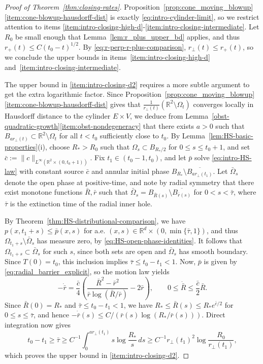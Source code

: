 \documentclass[11pt]{amsart}
\numberwithin{equation}{section}
\numberwithin{figure}{section}
\theoremstyle{plain}
\theoremstyle{definition}
\theoremstyle{remark}
\theoremstyle{plain}
\newcommand{\norm}[1]{\lVert #1 \rVert}
\def\R{\mathbb{R}}
\begin{document}
\begin{proof}[Proof of Theorem~\ref{thm:closing-rates}]

Proposition~\ref{prop:cone_moving_blowup}\ref{item:cone-blowup-hausdorff-dist} is exactly
\eqref{eq:intro-cylinder-limit}, so we restrict attention to items \ref{item:intro-closing-high-d}-\ref{item:intro-closing-intermediate}. Let $R_0$ be small enough that Lemma~\ref{lem:r_plus_upper_bd} applies, and thus $r_+(t)\leq C(t_0-t)^{1/2}$. By \eqref{eq:r-perp-r-plus-comparison}, $r_\perp(t)\leq r_+(t)$, so we conclude the upper bounds in items~\ref{item:intro-closing-high-d}
and~\ref{item:intro-closing-intermediate}.

The upper bound in \ref{item:intro-closing-d2} requires a more subtle argument to get the extra logarithmic factor. Since Proposition~\ref{prop:cone_moving_blowup}\ref{item:cone-blowup-hausdorff-dist} gives that $\frac{1}{r_\perp(t)}(\R^2\setminus \Omega_t)$ converges locally in Hausdorff distance to the cylinder $E \times V$, we deduce from Lemma~\ref{obst-quadratic-growth}\ref{item:obst-nondegeneracy} that there exists $a > 0$ such that $B_{a r_\perp(t)} \subset \R^2\setminus \Omega_t$ for all $t < t_0$ sufficiently close to $t_0$. By Lemma~\ref{lem:HS-basic-properties}(i), choose $R_*>R_0$
such that $\Omega_s\subset B_{R_*/2}$ for $0\leq s\leq t_0+1$, and set
$\bar c:=\norm{c}_{L^\infty(\R^2\times(0,t_0+1))}$. Fix $t_1\in (t_0-1, t_0)$, and let $\bar{p}$ solve \eqref{eq:intro-HS-law} with constant source $\bar c$ and annular initial phase $B_{R_*}\setminus \overline{B_{ar_\perp(t_1)}}$. Let $\bar \Omega_s$ denote the open phase at positive-time, and note by radial symmetry that there exist monotone functions $\bar R, \bar r$ such that $\bar \Omega_s = B_{\bar R(s)}\setminus \overline{B_{\bar r(s)}}$ for $0 < s < \bar \tau$, where $\bar \tau$ is the extinction time of the radial inner hole.

By Theorem~\ref{thm:HS-distributional-comparison}, we have $p(x,t_1 +s) \leq \bar p(x, s)$ for a.e. $(x,s)\in \R^d\times (0,\min\{\bar\tau,1\})$, and thus $ \Omega_{t_1+s} \setminus \bar \Omega_{s} $ has measure zero, by \eqref{eq:HS-open-phase-identities}. It follows that $\Omega_{t_1 + s}\subset \bar \Omega_s$ for such $s$, since both sets are open and $\bar \Omega_s$ has smooth boundary. Since $T(0)=t_0$, this inclusion implies $\bar\tau\leq t_0-t_1<1$. Now, $\bar p$ is given by \eqref{eq:radial_barrier_explicit}, so the motion law yields
\[
    -\dot{\bar r}
    =\frac{\bar c}{4}\left(
        \frac{\bar R^2-\bar r^2}{\bar r\log(\bar R/\bar r)}
        -2\bar r\right),
    \qquad
    0\leq\dot{\bar R}\leq\frac{\bar c}{2}\bar R.
\]
Since $\bar R(0)=R_*$ and $\bar\tau\leq t_0-t_1<1$, we have
$R_*\leq\bar R(s)\leq R_*e^{\bar c/2}$ for $0\leq s\leq\bar\tau$, and hence
$-\dot{\bar r}(s)\leq C/(\bar r(s)\log(R_*/\bar r(s)))$. Direct integration
now gives
\[
    t_0-t_1\geq\bar\tau
    \geq C^{-1}\int_0^{ar_{\perp}(t_1)}s\log\frac{R_*}{s}\,ds
    \geq C^{-1}r_{\perp}(t_1)^2\log\frac{R_0}{r_{\perp}(t_1)},
\]
which proves the upper bound in
\ref{item:intro-closing-d2}.


\end{proof}
\end{document}
